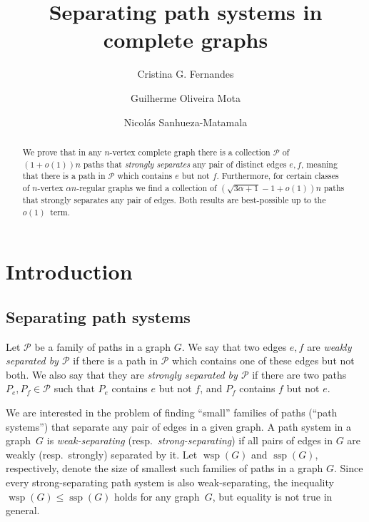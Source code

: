 \documentclass[a4paper, 11pt,reqno]{amsart}
\author[C. G. Fernandes]{Cristina G. Fernandes}
\author[G. O. Mota]{Guilherme Oliveira Mota}
\author[N.~Sanhueza-Matamala]{Nicol\'as Sanhueza-Matamala}
\title{Separating path systems in complete graphs}
\theoremstyle{plain}
\theoremstyle{definition}
\numberwithin{equation}{section}
\DeclareMathOperator{\wsp}{wsp}
\DeclareMathOperator{\ssp}{ssp}
\begin{document}
\onehalfspace

\begin{abstract}
  We prove that in any $n$-vertex complete graph there is a collection
  $\mathcal{P}$ of $(1 + o(1))n$ paths that \emph{strongly separates}
  any pair of distinct edges $e, f$, meaning that there is a path in
  $\mathcal{P}$ which contains $e$ but not $f$.
  Furthermore, for certain classes of $n$-vertex $\alpha n$-regular graphs 
  we find a collection of $(\sqrt{3 \alpha + 1} - 1 + o(1))n$ paths
  that strongly separates any pair of edges.
  Both results are best-possible up to the $o(1)$~term.
\end{abstract}

\maketitle

\section{Introduction}

\subsection{Separating path systems}

Let $\mathcal{P}$ be a family of paths in a graph $G$.  We say that
two edges $e, f$ are \emph{weakly separated by $\mathcal{P}$} if there
is a path in $\mathcal{P}$ which contains one of these edges but not
both.  We also say that they are \emph{strongly separated by
	$\mathcal{P}$} if there are two paths $P_e, P_f \in \mathcal{P}$
such that $P_e$ contains $e$ but not $f$, and $P_f$ contains $f$ but
not $e$.

We are interested in the problem of finding ``small'' families of
paths (``path systems'') that separate any pair of edges in a given graph.
A path system in a graph~$G$ is \emph{weak-separating}
(resp.~\emph{strong-separating}) if all pairs of edges in $G$ are
weakly (resp.~strongly) separated by it. Let $\wsp(G)$ and $\ssp(G)$,
respectively, denote the size of smallest such families of paths in a
graph $G$.  Since every strong-separating path system is also
weak-separating, the inequality $\wsp(G) \leq \ssp(G)$ holds for any
graph~$G$, but equality is not true in general.
\end{document}
